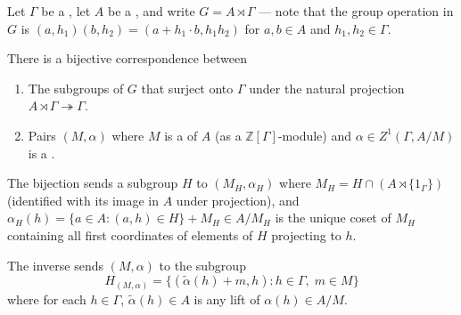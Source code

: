 \begin{theorem} \label{theorem:subgroups_of_semidirect_product_of_module_and_group_surject_onto_group_via_cocycle}
    Let $\Gamma$ be a , let $A$ be a , and write $G = A \rtimes \Gamma$ --- note that the group operation in $G$ is $(a, h_1)(b, h_2) = (a + h_1 \cdot b, h_1h_2)$ for $a,b \in A$ and $h_1,h_2 \in \Gamma$.

    There is a bijective correspondence between
    \begin{enumerate}
        \item The subgroups of $G$ that surject onto $\Gamma$ under the natural projection $A \rtimes \Gamma \twoheadrightarrow \Gamma$.
        \item Pairs $(M, \alpha)$ where $M$ is a  of $A$ (as a $\mathbb{Z}[\Gamma]$-module) and $\alpha \in Z^1(\Gamma, A/M)$ is a .
    \end{enumerate}
    The bijection sends a subgroup $H$ to $(M_H, \alpha_H)$ where $M_H = H \cap (A \rtimes \{1_\Gamma\})$ (identified with its image in $A$ under projection), and $\alpha_H(h) = \{a \in A : (a,h) \in H\} + M_H \in A/M_H$ is the unique coset of $M_H$ containing all first coordinates of elements of $H$ projecting to $h$.

    The inverse sends $(M, \alpha)$ to the subgroup
    $$H_{(M,\alpha)} = \{ (\tilde{\alpha}(h) + m, h) : h \in \Gamma,\; m \in M \}$$
    where for each $h \in \Gamma$, $\tilde{\alpha}(h) \in A$ is any lift of $\alpha(h) \in A/M$.

\end{theorem}




